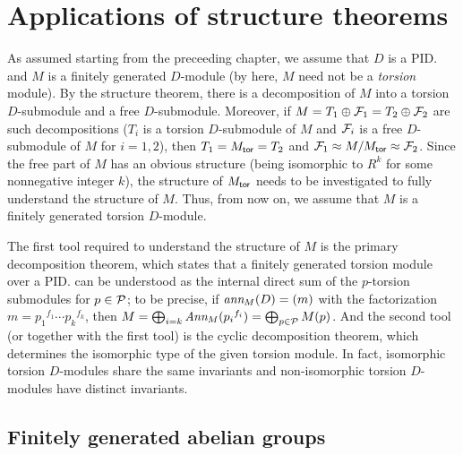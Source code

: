 \section{Applications of structure theorems}\label{applications of structure theorems}

As assumed starting from the preceeding chapter, we assume that $D$ is a PID. and $M$ is a finitely generated $D$-module (by here, $M$ need not be a \textit{torsion} module).
By the structure theorem, there is a decomposition of $M$ into a torsion $D$-submodule and a free $D$-submodule.
Moreover, if $M=T_1\oplus{\mathcal{F}}_1=T_2\oplus{\mathcal{F}}_2$ are such decompositions ($T_i$ is a torsion $D$-submodule of $M$ and ${\mathcal{F}}_i$ is a free $D$-submodule of $M$ for $i=1, 2$), then $T_1=M_{\textsf{tor}}=T_2$ and ${\mathcal{F}}_1\approx M/M_{\textsf{tor}}\approx {\mathcal{F}}_2$.
Since the free part of $M$ has an obvious structure (being isomorphic to $R^k$ for some nonnegative integer $k$), the structure of $M_{\textsf{tor}}$ needs to be investigated to fully understand the structure of $M$.
Thus, from now on, we assume that $M$ is a finitely generated torsion $D$-module.

The first tool required to understand the structure of $M$ is the primary decomposition theorem, which states that a finitely generated torsion module over a PID. can be understood as the internal direct sum of the $p$-torsion submodules for $p\in{\mathcal{P}}$; to be precise, if $\textit{ann}_M(D)=(m)$ with the factorization $m={p_1}^{f_1}\cdots{p_k}^{f_k}$, then $M=\bigoplus_{i=k}\textit{Ann}_M({p_i}^{f_i})=\bigoplus_{p\in{\mathcal{P}}} M(p)$.
And the second tool (or together with the first tool) is the cyclic decomposition theorem, which determines the isomorphic type of the given torsion module.
In fact, isomorphic torsion $D$-modules share the same invariants and non-isomorphic torsion $D$-modules have distinct invariants.

\subsection{Finitely generated abelian groups}

